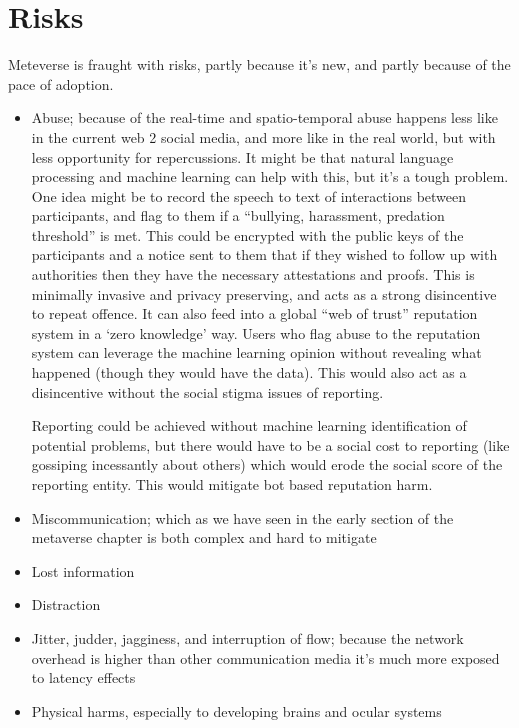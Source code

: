 \section{Risks}
Meteverse is fraught with risks, partly because it's new, and partly because of the pace of adoption.
\begin{itemize}
\item Abuse; because of the real-time and spatio-temporal abuse happens less like in the current web 2 social media, and more like in the real world, but with less opportunity for repercussions. It might be that natural language processing and machine learning can help with this, but it's a tough problem. One idea might be to record the speech to text of interactions between participants, and flag to them if a ``bullying, harassment, predation threshold'' is met. This could be encrypted with the public keys of the participants and a notice sent to them that if they wished to follow up with authorities then they have the necessary attestations and proofs. This is minimally invasive and privacy preserving, and acts as a strong disincentive to repeat offence. It can also feed into a global ``web of trust'' reputation system in a `zero knowledge' way. Users who flag abuse to the reputation system can leverage the machine learning opinion without revealing what happened (though they would have the data). This would also act as a disincentive without the social stigma issues of reporting.\par
Reporting could be achieved without machine learning identification of potential problems, but there would have to be a social cost to reporting (like gossiping incessantly about others) which would erode the social score of the reporting entity. This would mitigate bot based reputation harm.
\item Miscommunication; which as we have seen in the early section of the metaverse chapter is both complex and hard to mitigate
\item Lost information
\item Distraction
\item Jitter, judder, jagginess, and interruption of flow; because the network overhead is higher than other communication media it's much more exposed to latency effects 
\item Physical harms, especially to developing brains and ocular systems
\end{itemize}
%

%